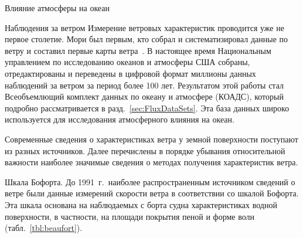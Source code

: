 \begin{chapter}{Влияние атмосферы на океан}
\begin{section}{Наблюдения за ветром}\label{sec:wndmeas}
Измерение ветровых характеристик проводится уже не первое
столетие. Мори был первым, кто собрал и систематизировал данные
по ветру и составил первые карты ветра~\cite{Maury:1855}. 
В настоящее время Национальным 
управлением по исследованию океанов и атмосферы США собраны,
отредактированы и переведены в цифровой формат миллионы данных
наблюдений за ветром за период более 100 лет. Результатом этой работы
стал Всеобъемлющий комплект данных по океану и атмосфере (КОАДС),
который подробно рассматривается в разд.~\ref{sec:FluxDataSets}. 
Эта база данных широко используется для исследования атмосферного 
влияния на океан.
%

Современные сведения о характеристиках ветра у земной поверхности
поступают из разных источников. Далее перечислены в порядке убывания
относительной важности наиболее значимые сведения о методах получения
характеристик ветра.
%


\begin{paragraph}{Шкала Бофорта.}
До 1991~г.\ наиболее распространенным источником сведений о ветре были данные
измерений скорости ветра в соответствии со шкалой Бофорта. Эта шкала основана
на наблюдаемых с борта судна характеристиках водной поверхности, в
частности, на площади покрытия пеной и форме волн (табл.~\ref{tbl:beaufort}).
%


\end{paragraph}
\end{section}
\end{chapter}
